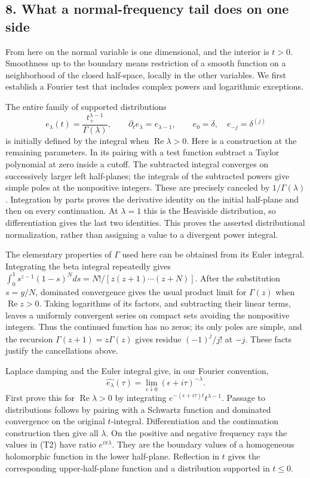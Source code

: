 \documentclass[
  11pt,
]{article}
\begin{document}
\subsection{8. What a normal-frequency tail does on one
side}\label{what-a-normal-frequency-tail-does-on-one-side}

From here on the normal variable is one dimensional, and the interior is
\(t>0\). Smoothness up to the boundary means restriction of a smooth
function on a neighborhood of the closed half-space, locally in the
other variables. We first establish a Fourier test that includes complex
powers and logarithmic exceptions.

The entire family of supported distributions \[
e_\lambda(t)=\frac{t_+^{\lambda-1}}{\Gamma(\lambda)},\qquad
\partial_t e_\lambda=e_{\lambda-1},\qquad
e_0=\delta,
\quad e_{-j}=\delta^{(j)}
\tag{T1}
\] is initially defined by the integral when
\(\operatorname{Re}\lambda>0\). Here is a construction at the remaining
parameters. In its pairing with a test function subtract a Taylor
polynomial at zero inside a cutoff. The subtracted integral converges on
successively larger left half-planes; the integrals of the subtracted
powers give simple poles at the nonpositive integers. These are
precisely canceled by \(1/\Gamma(\lambda)\). Integration by parts proves
the derivative identity on the initial half-plane and then on every
continuation. At \(\lambda=1\) this is the Heaviside distribution, so
differentiation gives the last two identities. This proves the asserted
distributional normalization, rather than assigning a value to a
divergent power integral.

The elementary properties of \(\Gamma\) used here can be obtained from
its Euler integral. Integrating the beta integral repeatedly gives
\(\int_0^1 s^{z-1}(1-s)^Nds=N!/[z(z+1)\cdots(z+N)]\). After the
substitution \(s=y/N\), dominated convergence gives the usual product
limit for \(\Gamma(z)\) when \(\operatorname{Re}z>0\). Taking logarithms
of its factors, and subtracting their linear terms, leaves a uniformly
convergent series on compact sets avoiding the nonpositive integers.
Thus the continued function has no zeros; its only poles are simple, and
the recursion \(\Gamma(z+1)=z\Gamma(z)\) gives residue \((-1)^j/j!\) at
\(-j\). These facts justify the cancellations above.

Laplace damping and the Euler integral give, in our Fourier convention,
\[
\widehat {e_\lambda}(\tau)
=\lim_{\epsilon\downarrow0}(\epsilon+i\tau)^{-\lambda}.
\tag{T2}
\] First prove this for \(\operatorname{Re}\lambda>0\) by integrating
\(e^{-(\epsilon+i\tau)t}t^{\lambda-1}\). Passage to distributions
follows by pairing with a Schwartz function and dominated convergence on
the original \(t\)-integral. Differentiation and the continuation
construction then give all \(\lambda\). On the positive and negative
frequency rays the values in (T2) have ratio \(e^{i\pi\lambda}\). They
are the boundary values of a homogeneous holomorphic function in the
lower half-plane. Reflection in \(t\) gives the corresponding
upper-half-plane function and a distribution supported in \(t\leq0\).
\end{document}
